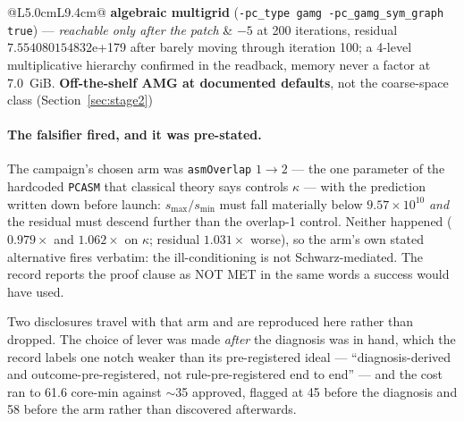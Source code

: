 \documentclass[11pt,a4paper]{article}
\begin{document}
\begin{table}[htbp]
\begin{tabular}{@{}L{5.0cm}L{9.4cm}@{}}
\textbf{algebraic multigrid} (\texttt{-pc\_type gamg -pc\_gamg\_sym\_graph true}) --- \emph{reachable only after the patch} & \(-5\) at 200 iterations, residual \(7.554080154832\)e+179 after barely moving through iteration 100; a 4-level multiplicative hierarchy confirmed in the readback, memory never a factor at 7.0~GiB. \textbf{Off-the-shelf AMG at documented defaults}, not the coarse-space class (Section~\ref{sec:stage2}) \\
\bottomrule
\end{tabular}
\caption{Twelve candidate causes, each refuted by a measurement rather than by an argument. The
last two were unreachable from the shipped build at all and were run only after the defect of
Section~\ref{sec:kspoverride} was patched locally; both reported the control's own iteration-0
residual, \(2.121343646203\times10^{-2}\), which is what makes them commensurable with the ten
above them. What survives is a negative characterisation with a number attached: the rung-3
adjoint operator, as ASM+ILU(0) preconditioning sees it, carries \(\kappa\approx10^{11}\)
(\(s_{\max}/s_{\min}=9.57\times10^{10}\) at iteration 400), and that value is insensitive to
every preconditioner parameter this build exposes.}
\label{tab:elim}
\end{table}

\paragraph{The falsifier fired, and it was pre-stated.} The campaign's chosen arm was
\texttt{asmOverlap} \(1\rightarrow2\) --- the one parameter of the hardcoded \texttt{PCASM} that
classical theory says controls \(\kappa\) --- with the prediction written down before launch:
\(s_{\max}/s_{\min}\) must fall materially below \(9.57\times10^{10}\) \emph{and} the residual
must descend further than the overlap-1 control. Neither happened (\(0.979\times\) and
\(1.062\times\) on \(\kappa\); residual \(1.031\times\) worse), so the arm's own stated
alternative fires verbatim: the ill-conditioning is not Schwarz-mediated. The record reports the
proof clause as NOT MET in the same words a success would have used.

Two disclosures travel with that arm and are reproduced here rather than dropped. The choice of
lever was made \emph{after} the diagnosis was in hand, which the record labels one notch weaker
than its pre-registered ideal --- ``diagnosis-derived and outcome-pre-registered, not
rule-pre-registered end to end'' --- and the cost ran to 61.6 core-min against \(\sim\)35
approved, flagged at 45 before the diagnosis and 58 before the arm rather than discovered
afterwards.
\end{document}
